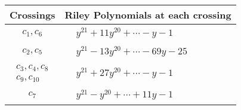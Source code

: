 \documentclass[1p]{elsarticle_modified}
\theoremstyle{definition}
\begin{document}
\begin{tabular}{m{50pt}|m{274pt}}
Crossings & \hspace{64pt}Riley Polynomials at each crossing \\
\hline $$\begin{aligned}c_{1},c_{6}\end{aligned}$$&$\begin{aligned}
&y^{21}+11 y^{20}+\cdots- y-1
\end{aligned}$\\
\hline $$\begin{aligned}c_{2},c_{5}\end{aligned}$$&$\begin{aligned}
&y^{21}-13 y^{20}+\cdots-69 y-25
\end{aligned}$\\
\hline $$\begin{aligned}c_{3},c_{4},c_{8}\\c_{9},c_{10}\end{aligned}$$&$\begin{aligned}
&y^{21}+27 y^{20}+\cdots- y-1
\end{aligned}$\\
\hline $$\begin{aligned}c_{7}\end{aligned}$$&$\begin{aligned}
&y^{21}- y^{20}+\cdots+11 y-1
\end{aligned}$\\
\hline
\end{tabular}
\vskip 2pc
\end{document}
